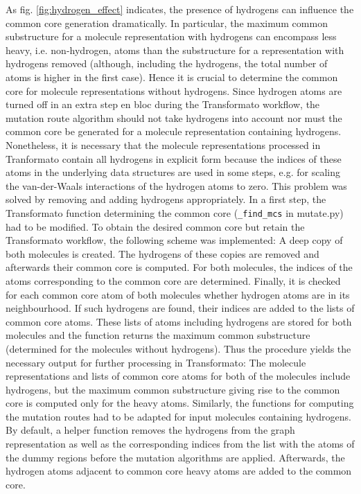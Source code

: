 As fig. \ref{fig:hydrogen_effect} indicates, the presence of hydrogens can influence the common core generation dramatically. In particular, the maximum common substructure for a molecule representation with hydrogens can encompass less heavy, i.e. non-hydrogen, atoms than the substructure for a representation with hydrogens removed (although, including the hydrogens, the total number of atoms is higher in the first case). Hence it is crucial to determine the common core for molecule representations without hydrogens. Since hydrogen atoms are turned off in an extra step en bloc during the Transformato workflow, the mutation route algorithm should not take hydrogens into account nor must the common core be generated for a molecule representation containing hydrogens.
Nonetheless, it is necessary that the molecule representations processed in Tranformato contain all hydrogens in explicit form because the indices of these atoms in the underlying data structures are used in some steps, e.g. for scaling the van-der-Waals interactions of the hydrogen atoms to zero.
This problem was solved by removing and adding hydrogens appropriately.
In a first step, the Transformato function determining the common core (\texttt{\_find\_mcs} in mutate.py) had to be modified. To obtain the desired common core but retain the Transformato workflow, the following scheme was implemented:
A deep copy of both molecules is created. The hydrogens of these copies are removed and afterwards their common core is computed. For both molecules, the indices of the atoms corresponding to the common core are determined. Finally, it is checked for each common core atom of both molecules whether hydrogen atoms are in its neighbourhood. If such hydrogens are found, their indices are added to the lists of common core atoms. These lists of atoms including hydrogens are stored for both molecules and the function returns the maximum common substructure (determined for the molecules without hydrogens).
Thus the procedure yields the necessary output for further processing in Transformato: The molecule representations and lists of common core atoms for both of the molecules include hydrogens, but the maximum common substructure giving rise to the common core is computed only for the heavy atoms.
Similarly, the functions for computing the mutation routes had to be adapted for input molecules containing hydrogens. By default, a helper function removes the hydrogens from the graph representation as well as the corresponding indices from the list with the atoms of the dummy regions before the mutation algorithms are applied. Afterwards, the hydrogen atoms adjacent to common core heavy atoms are added to the common core.
